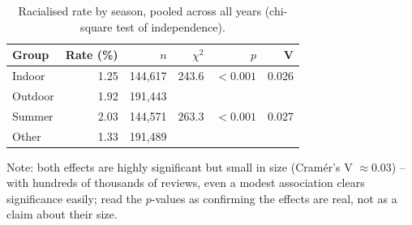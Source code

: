 
\begin{table}[htbp]
\centering
\footnotesize
\setlength{\tabcolsep}{4pt}
\caption{Racialised rate by season, pooled across all years (chi-square test of independence).}
\label{tab:racialised-rate-season}
\begin{tabular}{@{} l r r r r r @{}}
\toprule
Group & Rate (\%) & $n$ & $\chi^2$ & $p$ & V \\
\midrule
Indoor & 1.25 & 144{,}617 & 243.6 & $<0.001$ & 0.026 \\
Outdoor & 1.92 & 191{,}443 & & & \\
\midrule
Summer & 2.03 & 144{,}571 & 263.3 & $<0.001$ & 0.027 \\
Other & 1.33 & 191{,}489 & & & \\
\bottomrule
\end{tabular}

\vspace{2pt}
\raggedright\footnotesize
Note: both effects are highly significant but small in size (Cram\'er's V $\approx 0.03$) -- with hundreds of thousands of reviews, even a modest association clears significance easily; read the $p$-values as confirming the effects are real, not as a claim about their size.
\end{table}

